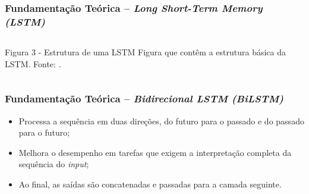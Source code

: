 \documentclass[aspectratio=169]{beamer}
\begin{document}
\begin{frame}[fragile] 
    \frametitle{Fundamentação Teórica -- \textit{Long Short-Term Memory (LSTM)}}
    \begin{columns}[c]
		\begin{column}{1\linewidth}
			\begin{figure}
				\label{fig:lstmStr}
			\end{figure}

			\begin{block}{ Figura 3 - Estrutura de uma LSTM}
				Figura que contêm a estrutura básica da LSTM. \newline Fonte: \cite{graves}.    
			\end{block}
		\end{column}
	\end{columns}
\end{frame}

\begin{frame}[fragile] 
    \frametitle{Fundamentação Teórica -- \textit{Bidirecional LSTM (BiLSTM)}}
	\begin{itemize}
		\item Processa a sequência em duas direções, do futuro para o passado e do passado para o futuro;
		\item Melhora o desempenho em tarefas que exigem a interpretação completa da sequência do \textit{input};
		\item Ao final, as saídas são concatenadas e passadas para a camada seguinte.
	\end{itemize}
\end{frame}
\end{document}
